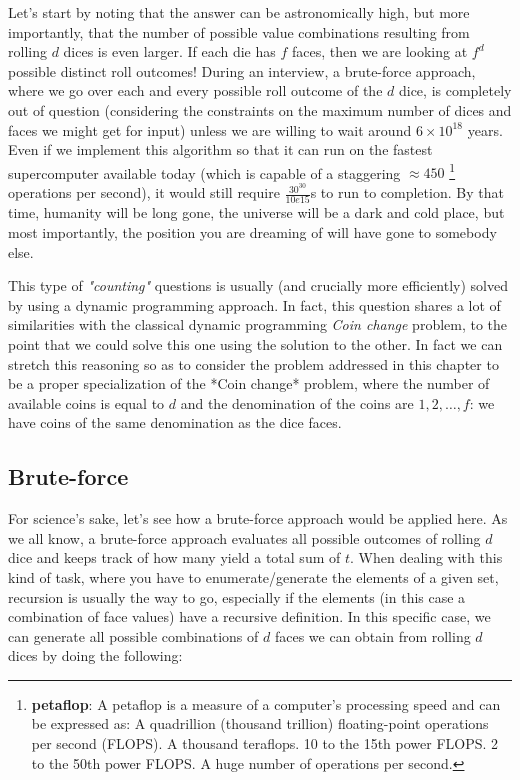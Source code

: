 Let's start by noting that the answer can be astronomically high, but more importantly, that the number of possible value combinations resulting from rolling $d$ dices is even larger. If each die has
$f$ faces, then we are looking at $f^d$ possible distinct roll outcomes! 
During an interview, a brute-force approach, where we go over each and every possible roll outcome of the $d$ dice, is completely out of question  (considering the constraints on the maximum number of dices and faces we might get for input) unless we are willing to wait around  $6 \times 10^{18}$ years. Even if we implement this algorithm so that it can run on the fastest supercomputer available today (which is capable of a staggering $\approx450$ \footnote{\textbf{petaflop}: A petaflop is a measure of a computer's processing speed and can be expressed as: A quadrillion (thousand trillion) floating-point operations per second (FLOPS). A thousand teraflops. 10 to the 15th power FLOPS. 2 to the 50th power FLOPS. A huge number of operations per second.} operations per second), it would still require $\frac{30^{30}}{10e15}$s to run to completion. By that time, humanity will be long gone, the universe will be a dark and cold place, but most importantly, the position you are dreaming of will have gone to somebody else.

This type of \textit{"counting"} questions is usually (and crucially more efficiently) solved by using a dynamic programming
approach. In fact, this question shares a lot of similarities with the classical dynamic programming
\textit{Coin change} problem, to the point that we
could solve this one using the solution to the other. In fact we can stretch this reasoning so as to consider the problem addressed in this chapter to be a proper specialization of the *Coin
change* problem, where the number of available coins is equal to $d$
and the denomination of the coins are $1,2,\ldots,f$: we have coins of the same denomination as the
dice faces.




\subsection{Brute-force}
\label{dice_rolls:sec:bruteforce}


For science's sake, let's see how a brute-force approach would be applied here. As we all know, a brute-force approach evaluates all possible outcomes of rolling $d$ dice and keeps
track of how many yield a total sum of $t$. When dealing with this kind of task, where you have to
enumerate/generate the elements of a given set, recursion is usually the way to go, especially if the elements (in this case a combination of face values) have a recursive definition.
In this specific case, we can generate all possible combinations of $d$ faces we can obtain from rolling $d$ dices by doing the following:

